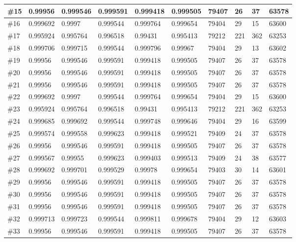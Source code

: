 \begin{longtable}{l|l|l|l|l|l|l|l|l|l}
\#15 & 0.99956  & 0.999546 & 0.999591 & 0.999418 & 0.999505 & 79407 & 26  & 37  & 63578 \\ \hline
\#16 & 0.999692 & 0.9997   & 0.999544 & 0.999764 & 0.999654 & 79404 & 29  & 15  & 63600 \\ \hline
\#17 & 0.995924 & 0.995764 & 0.996518 & 0.99431  & 0.995413 & 79212 & 221 & 362 & 63253 \\ \hline
\#18 & 0.999706 & 0.999715 & 0.999544 & 0.999796 & 0.99967  & 79404 & 29  & 13  & 63602 \\ \hline
\#19 & 0.99956  & 0.999546 & 0.999591 & 0.999418 & 0.999505 & 79407 & 26  & 37  & 63578 \\ \hline
\#20 & 0.99956  & 0.999546 & 0.999591 & 0.999418 & 0.999505 & 79407 & 26  & 37  & 63578 \\ \hline
\#21 & 0.99956  & 0.999546 & 0.999591 & 0.999418 & 0.999505 & 79407 & 26  & 37  & 63578 \\ \hline
\#22 & 0.999692 & 0.9997   & 0.999544 & 0.999764 & 0.999654 & 79404 & 29  & 15  & 63600 \\ \hline
\#23 & 0.995924 & 0.995764 & 0.996518 & 0.99431  & 0.995413 & 79212 & 221 & 362 & 63253 \\ \hline
\#24 & 0.999685 & 0.999692 & 0.999544 & 0.999748 & 0.999646 & 79404 & 29  & 16  & 63599 \\ \hline
\#25 & 0.999574 & 0.999558 & 0.999623 & 0.999418 & 0.999521 & 79409 & 24  & 37  & 63578 \\ \hline
\#26 & 0.99956  & 0.999546 & 0.999591 & 0.999418 & 0.999505 & 79407 & 26  & 37  & 63578 \\ \hline
\#27 & 0.999567 & 0.99955  & 0.999623 & 0.999403 & 0.999513 & 79409 & 24  & 38  & 63577 \\ \hline
\#28 & 0.999692 & 0.999701 & 0.999529 & 0.99978  & 0.999654 & 79403 & 30  & 14  & 63601 \\ \hline
\#29 & 0.99956  & 0.999546 & 0.999591 & 0.999418 & 0.999505 & 79407 & 26  & 37  & 63578 \\ \hline
\#30 & 0.99956  & 0.999546 & 0.999591 & 0.999418 & 0.999505 & 79407 & 26  & 37  & 63578 \\ \hline
\#31 & 0.99956  & 0.999546 & 0.999591 & 0.999418 & 0.999505 & 79407 & 26  & 37  & 63578 \\ \hline
\#32 & 0.999713 & 0.999723 & 0.999544 & 0.999811 & 0.999678 & 79404 & 29  & 12  & 63603 \\ \hline
\#33 & 0.99956  & 0.999546 & 0.999591 & 0.999418 & 0.999505 & 79407 & 26  & 37  & 63578 \\ \hline

\end{longtable}

